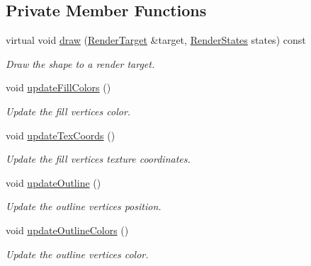 \subsection*{Private Member Functions}
\begin{DoxyCompactItemize}
\item 
virtual void \mbox{\hyperlink{classsf_1_1_shape_af335b88097f1db83afdfafa0cd66d04d}{draw}} (\mbox{\hyperlink{classsf_1_1_render_target}{Render\+Target}} \&target, \mbox{\hyperlink{classsf_1_1_render_states}{Render\+States}} states) const
\begin{DoxyCompactList}\small\item\em Draw the shape to a render target. \end{DoxyCompactList}\item 
void \mbox{\hyperlink{classsf_1_1_shape_a371b37d672f96660dcf70aa06b2fab77}{update\+Fill\+Colors}} ()
\begin{DoxyCompactList}\small\item\em Update the fill vertices\textquotesingle{} color. \end{DoxyCompactList}\item 
void \mbox{\hyperlink{classsf_1_1_shape_a4a7ea7b0254b26ac36c27a5ff545f4b3}{update\+Tex\+Coords}} ()
\begin{DoxyCompactList}\small\item\em Update the fill vertices\textquotesingle{} texture coordinates. \end{DoxyCompactList}\item 
void \mbox{\hyperlink{classsf_1_1_shape_a1364b357a1041ff38c872871a5c28623}{update\+Outline}} ()
\begin{DoxyCompactList}\small\item\em Update the outline vertices\textquotesingle{} position. \end{DoxyCompactList}\item 
void \mbox{\hyperlink{classsf_1_1_shape_a55d37129600d23db54d5b6cacb2d6d67}{update\+Outline\+Colors}} ()
\begin{DoxyCompactList}\small\item\em Update the outline vertices\textquotesingle{} color. \end{DoxyCompactList}\end{DoxyCompactItemize}
